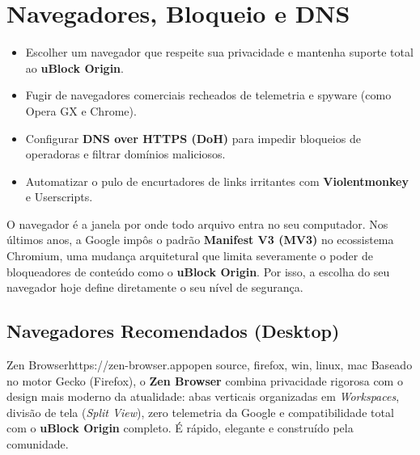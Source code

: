 \documentclass{pousadaguide}
\begin{document}
\chapter{Navegadores, Bloqueio e DNS}

\begin{missao}
\begin{itemize}
  \item Escolher um navegador que respeite sua privacidade e mantenha suporte total ao \textbf{uBlock Origin}.
  \item Fugir de navegadores comerciais recheados de telemetria e spyware (como Opera GX e Chrome).
  \item Configurar \textbf{DNS over HTTPS (DoH)} para impedir bloqueios de operadoras e filtrar domínios maliciosos.
  \item Automatizar o pulo de encurtadores de links irritantes com \textbf{Violentmonkey} e Userscripts.
\end{itemize}
\end{missao}

O navegador é a janela por onde todo arquivo entra no seu computador. Nos últimos anos, a Google impôs o padrão \textbf{Manifest V3 (MV3)} no ecossistema Chromium, uma mudança arquitetural que limita severamente o poder de bloqueadores de conteúdo como o \textbf{uBlock Origin}. Por isso, a escolha do seu navegador hoje define diretamente o seu nível de segurança.

\section{Navegadores Recomendados (Desktop)}

\begin{ferramenta}[goat,logo=zenbrowser]{Zen Browser}{https://zen-browser.app}{open source, firefox, win, linux, mac}
Baseado no motor Gecko (Firefox), o \textbf{Zen Browser} combina privacidade rigorosa com o design mais moderno da atualidade: abas verticais organizadas em \emph{Workspaces}, divisão de tela (\emph{Split View}), zero telemetria da Google e compatibilidade total com o \textbf{uBlock Origin} completo. É rápido, elegante e construído pela comunidade. 
\end{ferramenta}
\end{document}
